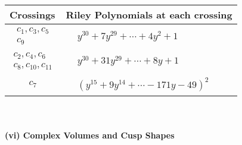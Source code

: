 \documentclass[1p]{elsarticle_modified}
\theoremstyle{definition}
\begin{document}
\begin{tabular}{m{50pt}|m{274pt}}
Crossings & \hspace{64pt}Riley Polynomials at each crossing \\
\hline $$\begin{aligned}c_{1},c_{3},c_{5}\\c_{9}\end{aligned}$$&$\begin{aligned}
&y^{30}+7 y^{29}+\cdots+4 y^2+1
\end{aligned}$\\
\hline $$\begin{aligned}c_{2},c_{4},c_{6}\\c_{8},c_{10},c_{11}\end{aligned}$$&$\begin{aligned}
&y^{30}+31 y^{29}+\cdots+8 y+1
\end{aligned}$\\
\hline $$\begin{aligned}c_{7}\end{aligned}$$&$\begin{aligned}
&(y^{15}+9 y^{14}+\cdots-171 y-49)^{2}
\end{aligned}$\\
\hline
\end{tabular}\\~\\
\newpage\flushleft \textbf{(vi) Complex Volumes and Cusp Shapes}
\end{document}
